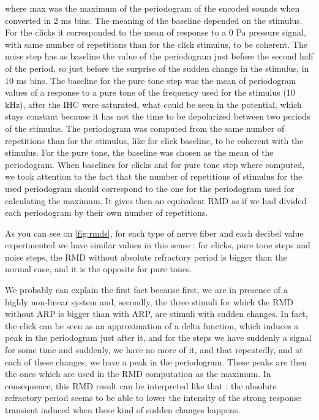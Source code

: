 where max was 
the maximum of the periodogram of the encoded sounds when converted in 2 ms bins.
The meaning of the baseline depended on the stimulus. 
For the clicks it corresponded to the mean of response to a 0 Pa pressure signal,
 with same number of repetitions than for the click stimulus, to be coherent. 
The noise step has as baseline the value of the periodogram just before the second 
half of the period, so just before the surprise of the sudden change in the stimulus,
 in 10 ms bins. 
The baseline for the pure tone step was the mean of periodogram values
of a response to a pure tone of the frequency used for the stimulus (10 kHz),
after the IHC were saturated, what could be seen in the potential, 
which stays constant because it has not the time 
to be depolarized between two periods of the stimulus. 
The periodogram was computed from the same number of repetitions than for the stimulus, 
like for click baseline, to be coherent with the stimulus.
For the pure tone, the baseline was chosen as the mean of the periodogram.
When baselines for clicks and for pure tone step where computed, 
we took attention to the fact that the number of repetitions of stimulus
for the used periodogram should correspond to the one for the periodogram used for 
calculating the maximum. 
It gives then an equivalent RMD as if we had divided each periodogram by 
their own number of repetitions.

As you can see on \autoref{fig:rmds}, for each type of nerve fiber and 
each decibel value experimented we have similar values in this sense :
for clicks, pure tone steps and noise steps, the RMD without absolute refractory
period is bigger than the normal case, and it is the opposite for pure tones.




We probably can explain the first fact because first, we are in presence of a highly 
non-linear system and, 
secondly, the three stimuli for which the RMD without ARP is bigger than with 
ARP, are stimuli with sudden changes. 
In fact, the click can be seen as an approximation of a delta function, 
which induces a peak in the periodogram just after it, 
and for the steps we have suddenly a signal for some time and suddenly, 
we have no more of it, and that repeatedly, and at each of these changes, 
we have a peak in the periodogram. 
These peaks are then the ones which are used in the RMD computation as the maximum.
In consequence, this RMD result can be interpreted like that : the absolute refractory period 
seems to be able to lower the intensity of the strong response transient induced 
when these kind of sudden changes happens.


